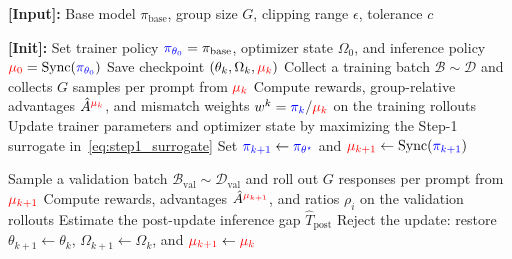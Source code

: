 \begin{algorithm}[t]
\caption{Monotonic Inference Policy Update}
\label{alg:monotonic_inference_update}
\begin{algorithmic}[1]
\State \textbf{[Input]:} Base model $\pi_{\mathrm{base}}$, group size $G$, clipping range $\epsilon$, tolerance $c$

\State \textbf{[Init]:} Set trainer policy $\textcolor{blue}{\pi_{\theta_0}}=\pi_{\mathrm{base}}$, optimizer state $\Omega_0$, and inference policy $\textcolor{red}{\mu_0}=\mathrm{Sync}(\textcolor{blue}{\pi_{\theta_0}})$
    \State Save checkpoint $(\theta_k,\Omega_k,\textcolor{red}{\mu_k})$
    \Statex \hspace{0.5cm} \textcolor{orange}{}
    \State Collect a training batch $\mathcal{B}\sim\mathcal{D}$ and collects $G$ samples per prompt from $\textcolor{red}{\mu_k}$
    \State Compute rewards, group-relative advantages $\hat{A}^{\textcolor{red}{\mu_k}}$, and mismatch weights $w^k=\textcolor{blue}{\pi_k}/\textcolor{red}{\mu_k}$ on the training rollouts
    \State Update trainer parameters and optimizer state by maximizing the Step-1 surrogate in~\autoref{eq:step1_surrogate}
    \State Set $\textcolor{blue}{\pi_{k+1}}\leftarrow\textcolor{blue}{\pi_{\theta^\star}}$ and $\textcolor{red}{\mu_{k+1}}\leftarrow\mathrm{Sync}(\textcolor{blue}{\pi_{k+1}})$
    
    \Statex  \hspace{0.5cm} \textcolor{orange}{}
    \State Sample a validation batch $\mathcal{B}_{\mathrm{val}}\sim\mathcal{D}_{\mathrm{val}}$ and roll out $G$ responses per prompt from $\textcolor{red}{\mu_{k+1}}$
\State Compute rewards, advantages $\hat{A}^{\textcolor{red}{\mu_{k+1}}}$, and ratios $\rho_i$ on the validation rollouts
    \State Estimate the post-update inference gap $\widehat{T}_\mathrm{post}$
        \State Reject the update: restore $\theta_{k+1}\leftarrow\theta_k$, $\Omega_{k+1}\leftarrow\Omega_k$, and $\textcolor{red}{\mu_{k+1}}\leftarrow\textcolor{red}{\mu_k}$
    \EndIf
\EndFor
\end{algorithmic}
\end{algorithm}